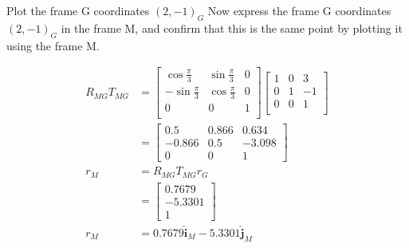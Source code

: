 Plot the frame G coordinates $(2, -1)_G$ Now express the frame G coordinates $(2, -1)_G$ in the frame M, and confirm that this is the same point by plotting it using the frame M.

\begin{solution}
\begin{align*}
    R_{MG}T_{MG} &= \begin{bmatrix}
        \cos{\frac{\pi}{3}} & \sin{\frac{\pi}{3}} & 0 \\
        -\sin{\frac{\pi}{3}} & \cos{\frac{\pi}{3}} & 0 \\
        0 & 0 & 1 \\
    \end{bmatrix} \begin{bmatrix}
        1 & 0 & 3 \\
        0 & 1 & -1 \\
        0 & 0 & 1 \\
    \end{bmatrix} \\
    &= \begin{bmatrix}
        0.5 & 0.866 & 0.634 \\
        -0.866 & 0.5 & -3.098 \\
        0 & 0 & 1
    \end{bmatrix} \\
    r_M &= R_{MG} T_{MG} r_G \\
    &= \begin{bmatrix}
        0.7679 \\
       -5.3301 \\
        1
    \end{bmatrix} \\
    r_M &= 0.7679 \boldsymbol{\hat{i}}_M - 5.3301 \boldsymbol{\hat{j}}_M
\end{align*}

\begin{center}
\end{center}
\end{solution}